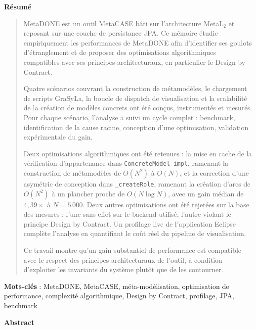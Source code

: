 \noindent\textbf{\huge Résumé}
\bigskip

\begin{quote}
MetaDONE est un outil MetaCASE bâti sur l'architecture MetaL$_2$ et reposant sur une couche de persistance JPA. Ce mémoire étudie empiriquement les performances de MetaDONE afin d'identifier ses goulots d'étranglement et de proposer des optimisations algorithmiques compatibles avec ses principes architecturaux, en particulier le Design by Contract.

Quatre scénarios couvrant la construction de métamodèles, le chargement de scripts GraSyLa, la boucle de dispatch de visualisation et la scalabilité de la création de modèles concrets ont été conçus, instrumentés et mesurés. Pour chaque scénario, l'analyse a suivi un cycle complet : benchmark, identification de la cause racine, conception d'une optimisation, validation expérimentale du gain.

Deux optimisations algorithmiques ont été retenues : la mise en cache de la vérification d'appartenance dans \texttt{ConcreteModel\_impl}, ramenant la construction de métamodèles de $O(N^2)$ à $O(N)$, et la correction d'une asymétrie de conception dans \texttt{\_createRole}, ramenant la création d'arcs de $O(N^2)$ à un plancher proche de $O(N \log N)$, avec un gain médian de $4{,}39\times$ à $N = 5\,000$. Deux autres optimisations ont été rejetées sur la base des mesures : l'une sans effet sur le backend utilisé, l'autre violant le principe Design by Contract. Un profilage live de l'application Eclipse complète l'analyse en quantifiant le coût réel du pipeline de visualisation.

Ce travail montre qu'un gain substantiel de performance est compatible avec le respect des principes architecturaux de l'outil, à condition d'exploiter les invariants du système plutôt que de les contourner.
\end{quote}
\bigskip
\noindent\textbf{Mots-clés} : MetaDONE, MetaCASE, méta-modélisation, optimisation de performance, complexité algorithmique, Design by Contract, profilage, JPA, benchmark

\vspace{0.75cm}

\noindent\textbf{\huge Abstract}
\bigskip

